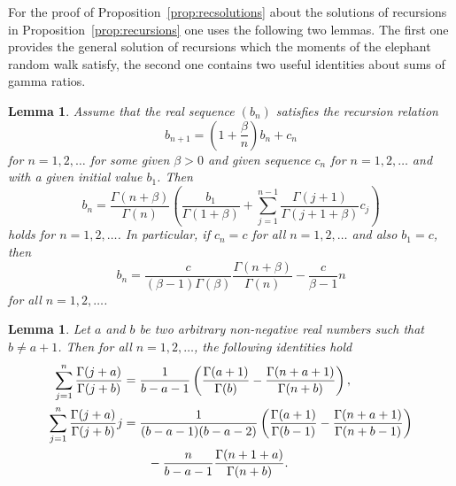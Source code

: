 \documentclass[12pt,a4paper]{article}
\newtheorem{lemma}[thm]{Lemma}
\numberwithin{equation}{section}
\begin{document}
For the proof of Proposition~\ref{prop:recsolutions} about the solutions of recursions in Proposition~\ref{prop:recursions} one uses the following two lemmas.
The first one provides the general solution of recursions which the moments of the elephant random walk satisfy,
the second one contains two useful identities about sums of gamma ratios.

\begin{lemma}\label{lemma:recursions}
Assume that the real sequence $(b_n)$ satisfies the recursion relation
\begin{equation}\label{bnrecursion}
b_{n+1}=\left(1+\frac\beta n\right)b_n+c_n
\end{equation}
for $n=1,2,\dots$ for some given $\beta>0$ and given sequence $c_n$ for $n=1,2,\dots$ and with a given initial value $b_1$.
Then
\begin{equation}\label{bnexplicit}
b_n=\frac{\Gamma(n+\beta)}{\Gamma(n)}\left(\frac{b_1}{\Gamma(1+\beta)}+\sum_{j=1}^{n-1}\frac{\Gamma(j+1)}{\Gamma(j+1+\beta)}c_j\right)
\end{equation}
holds for $n=1,2,\dots$.
In particular, if $c_n=c$ for all $n=1,2,\dots$ and also $b_1=c$, then
\begin{equation}\label{bnexplicitsimple}
b_n=\frac c{(\beta-1)\Gamma(\beta)}\frac{\Gamma(n+\beta)}{\Gamma(n)}-\frac c{\beta-1}n
\end{equation}
for all $n=1,2,\dots$.
\end{lemma}

\begin{lemma}\label{lemma:gammasum}
Let $a$ and $b$ be two arbitrary non-negative real numbers such that $b\neq a+1$.
Then for all $n=1,2,\dots$, the following identities hold
\begin{align}
\sum_{j=1}^n\frac{\Gamma(j+a)}{\Gamma(j+b)}&=\frac1{b-a-1}\left(\frac{\Gamma(a+1)}{\Gamma(b)}-\frac{\Gamma(n+a+1)}{\Gamma(n+b)}\right),\label{gammasum1}\\
\sum_{j=1}^n\frac{\Gamma(j+a)}{\Gamma(j+b)}j&=\frac1{(b-a-1)(b-a-2)}\left(\frac{\Gamma(a+1)}{\Gamma(b-1)}-\frac{\Gamma(n+a+1)}{\Gamma(n+b-1)}\right)\label{gammasum2}\\
&\qquad-\frac{n}{b-a-1}\frac{\Gamma(n+1+a)}{\Gamma(n+b)}.\notag
\end{align}
\end{lemma}
\end{document}
